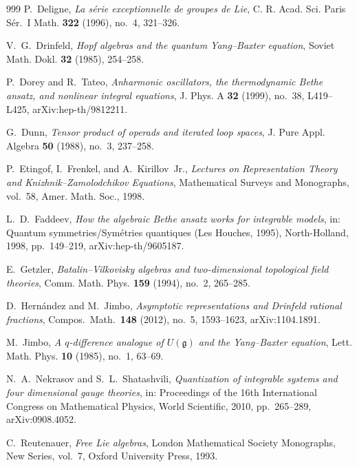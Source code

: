 \begin{thebibliography}{999}
P.~Deligne, \emph{La s\'erie exceptionnelle de groupes de Lie}, C. R. Acad. Sci. Paris S\'er.~I Math. \textbf{322} (1996), no.~4, 321--326.

V.~G.~Drinfeld, \emph{Hopf algebras and the quantum Yang--Baxter equation}, Soviet Math. Dokl. \textbf{32} (1985), 254--258.

P.~Dorey and R.~Tateo, \emph{Anharmonic oscillators, the thermodynamic Bethe ansatz, and nonlinear integral equations}, J. Phys. A \textbf{32} (1999), no.~38, L419--L425, arXiv:hep-th/9812211.

G.~Dunn, \emph{Tensor product of operads and iterated loop spaces}, J. Pure Appl. Algebra \textbf{50} (1988), no.~3, 237--258.

P.~Etingof, I.~Frenkel, and A.~Kirillov~Jr., \emph{Lectures on Representation Theory and Knizhnik--Zamolodchikov Equations}, Mathematical Surveys and Monographs, vol.~58, Amer. Math. Soc., 1998.

L.~D.~Faddeev, \emph{How the algebraic Bethe ansatz works for integrable models}, in: Quantum symmetries/Sym\'etries quantiques (Les Houches, 1995), North-Holland, 1998, pp.~149--219, arXiv:hep-th/9605187.

E.~Getzler, \emph{Batalin--Vilkovisky algebras and two-dimensional topological field theories}, Comm. Math. Phys. \textbf{159} (1994), no.~2, 265--285.

D.~Hern\'andez and M.~Jimbo, \emph{Asymptotic representations and Drinfeld rational fractions}, Compos.\ Math.\ \textbf{148} (2012), no.~5, 1593--1623, arXiv:1104.1891. %

M.~Jimbo, \emph{A $q$-difference analogue of $U(\mathfrak{g})$ and the Yang--Baxter equation}, Lett. Math. Phys. \textbf{10} (1985), no.~1, 63--69.

N.~A.~Nekrasov and S.~L.~Shatashvili, \emph{Quantization of integrable systems and four dimensional gauge theories}, in: Proceedings of the 16th International Congress on Mathematical Physics, World Scientific, 2010, pp.~265--289, arXiv:0908.4052.

C.~Reutenauer, \emph{Free Lie algebras}, London Mathematical Society Monographs, New Series, vol.~7, Oxford University Press, 1993.


\end{thebibliography}
